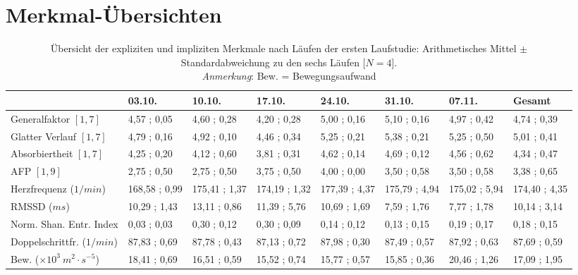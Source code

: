 \cleardoublepage

\section{Merkmal-Übersichten} 

\label{sec:merkmal_ubersichten} 
\begin{sidewaystable}
	\centering \caption[Übersicht der expliziten und impliziten Merkmale nach Läufen (Erste Studie: Laufen)]{Übersicht der expliziten und impliziten Merkmale nach Läufen der ersten Laufstudie: Arithmetisches Mittel $\pm$ Standardabweichung zu den sechs Läufen [$N = 4$]. \\
	\hspace{ 
	\textwidth}\emph{Anmerkung}: Bew. = Bewegungsaufwand} \label{tab:ubersicht_nach_laufen_1} 
	\begin{tabular}
		{lyyyyyyy} \toprule & 03.10. & 10.10. & 17.10. & 24.10. & 31.10. & 07.11. & Gesamt \\
		\midrule Generalfaktor $[1{,} 7]$ & 4{,}57 ; 0{,}05 & 4{,}60 ; 0{,}28 & 4{,}20 ; 0{,}28 & 5{,}00 ; 0{,}16 & 5{,}10 ; 0{,}16 & 4{,}97 ; 0{,}42 & 4{,}74 ; 0{,}39 \\
		Glatter Verlauf $[1{,} 7]$ & 4{,}79 ; 0{,}16 & 4{,}92 ; 0{,}10 & 4{,}46 ; 0{,}34 & 5{,}25 ; 0{,}21 & 5{,}38 ; 0{,}21 & 5{,}25 ; 0{,}50 & 5{,}01 ; 0{,}41 \\
		Absorbiertheit $[1{,} 7]$ & 4{,}25 ; 0{,}20 & 4{,}12 ; 0{,}60 & 3{,}81 ; 0{,}31 & 4{,}62 ; 0{,}14 & 4{,}69 ; 0{,}12 & 4{,}56 ; 0{,}62 & 4{,}34 ; 0{,}47 \\
		\ac{AFP} $[1{,} 9]$ & 2{,}75 ; 0{,}50 & 2{,}75 ; 0{,}50 & 3{,}75 ; 0{,}50 & 4{,}00 ; 0{,}00 & 3{,}50 ; 0{,}58 & 3{,}50 ; 0{,}58 & 3{,}38 ; 0{,}65 \\
		Herzfrequenz ($1/min$) & 168{,}58 ; 0{,}99 & 175{,}41 ; 1{,}37 & 174{,}19 ; 1{,}32 & 177{,}39 ; 4{,}37 & 175{,}79 ; 4{,}94 & 175{,}02 ; 5{,}94 & 174{,}40 ; 4{,}35 \\
		\acs{RMSSD} ($ms$) & 10{,}29 ; 1{,}43 & 13{,}11 ; 0{,}86 & 11{,}39 ; 5{,}76 & 10{,}69 ; 1{,}69 & 7{,}59 ; 1{,}76 & 7{,}77 ; 1{,}78 & 10{,}14 ; 3{,}14 \\
		Norm. Shan. Entr. Index & 0{,}03 ; 0{,}03 & 0{,}30 ; 0{,}12 & 0{,}30 ; 0{,}09 & 0{,}14 ; 0{,}12 & 0{,}13 ; 0{,}15 & 0{,}19 ; 0{,}17 & 0{,}18 ; 0{,}15 \\
		Doppelschrittfr. ($1/min$) & 87,83 ; 0,69 & 87,78 ; 0,43 & 87,13 ; 0,72 & 87,98 ; 0,30 & 87,49 ; 0,57 & 87,92 ; 0,63 & 87,69 ; 0,59 \\
		Bew. ($\times 10^3 \: m^2 \cdot s^{-5}$) & 18{,}41 ; 0{,}69 & 16{,}51 ; 0{,}59 & 15{,}52 ; 0{,}74 & 15{,}77 ; 0{,}57 & 15{,}85 ; 0{,}36 & 20{,}46 ; 1{,}26 & 17{,}09 ; 1{,}95 \\
		\bottomrule 
	\end{tabular}
\end{sidewaystable}
